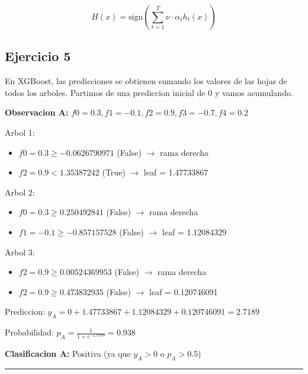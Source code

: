 \documentclass[12pt]{article}
\begin{document}
\[ H(x) = \text{sign}\left(\sum_{t=1}^{T} \nu \cdot \alpha_t h_t(x)\right) \]

\subsection{Ejercicio 5}

En XGBoost, las predicciones se obtienen sumando los valores de las hojas de todos los arboles. Partimos de una prediccion inicial de 0 y vamos acumulando.

\vspace{0.5em}

\textbf{Observacion A: } $f0 = 0.3, f1 = -0.1, f2 = 0.9, f3 = -0.7, f4 = 0.2$

\vspace{0.5em}

Arbol 1:
\begin{itemize}
    \item $f0 = 0.3 \geq -0.0626790971$ (False) $\rightarrow$ rama derecha
    \item $f2 = 0.9 < 1.35387242$ (True) $\rightarrow$ leaf = 1.47733867
\end{itemize}

Arbol 2:
\begin{itemize}
    \item $f0 = 0.3 \geq 0.250492841$ (False) $\rightarrow$ rama derecha
    \item $f1 = -0.1 \geq -0.857157528$ (False) $\rightarrow$ leaf = 1.12084329
\end{itemize}

Arbol 3:
\begin{itemize}
    \item $f2 = 0.9 \geq 0.00524369953$ (False) $\rightarrow$ rama derecha
    \item $f2 = 0.9 \geq 0.473832935$ (False) $\rightarrow$ leaf = 0.120746091
\end{itemize}

Prediccion: $y_A = 0 + 1.47733867 + 1.12084329 + 0.120746091 = 2.7189$

\vspace{1em}

Probabilidad: $p_A = \frac{1}{1 + e^{-2.7189}} = 0.938$

\vspace{1em}

\textbf{Clasificacion A: } Positiva (ya que $y_A > 0$ o $p_A > 0.5$)

\noindent\rule{\textwidth}{0.4pt}
\end{document}
